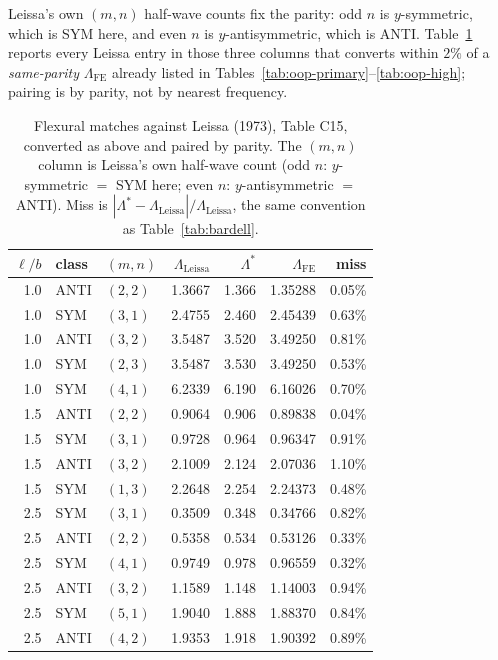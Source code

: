 \documentclass[11pt]{article}
\begin{document}
Leissa's own $(m,n)$ half-wave counts fix the parity: odd $n$ is
$y$-symmetric, which is SYM here, and even $n$ is $y$-antisymmetric, which
is ANTI. Table~\ref{tab:leissa} reports every Leissa entry in those three
columns that converts within $2\%$ of a \emph{same-parity}
$\Lambda_{\mathrm{FE}}$ already listed in
Tables~\ref{tab:oop-primary}--\ref{tab:oop-high}; pairing is by parity,
not by nearest frequency.

\begin{table}[!htbp]
\centering\footnotesize
\caption{Flexural matches against Leissa (1973), Table C15, converted as
above and paired by parity. The $(m,n)$ column is Leissa's own half-wave
count (odd $n$: $y$-symmetric $=$ SYM here; even $n$: $y$-antisymmetric $=$
ANTI). Miss is
$|\Lambda^{*}-\Lambda_{\text{Leissa}}|/\Lambda_{\text{Leissa}}$, the same
convention as Table~\ref{tab:bardell}.}\label{tab:leissa}
\setlength{\tabcolsep}{4pt}
\begin{tabular}{@{}rllrrrr@{}}
\toprule
$\ell/b$ & class & $(m,n)$ & $\Lambda_{\text{Leissa}}$ & $\Lambda^{*}$ & $\Lambda_{\mathrm{FE}}$ & miss \\
\midrule
1.0 & ANTI & $(2,2)$ & 1.3667 & 1.366 & 1.35288 & 0.05\% \\
1.0 & SYM  & $(3,1)$ & 2.4755 & 2.460 & 2.45439 & 0.63\% \\
1.0 & ANTI & $(3,2)$ & 3.5487 & 3.520 & 3.49250 & 0.81\% \\
1.0 & SYM  & $(2,3)$ & 3.5487 & 3.530 & 3.49250 & 0.53\% \\
1.0 & SYM  & $(4,1)$ & 6.2339 & 6.190 & 6.16026 & 0.70\% \\
1.5 & ANTI & $(2,2)$ & 0.9064 & 0.906 & 0.89838 & 0.04\% \\
1.5 & SYM  & $(3,1)$ & 0.9728 & 0.964 & 0.96347 & 0.91\% \\
1.5 & ANTI & $(3,2)$ & 2.1009 & 2.124 & 2.07036 & 1.10\% \\
1.5 & SYM  & $(1,3)$ & 2.2648 & 2.254 & 2.24373 & 0.48\% \\
2.5 & SYM  & $(3,1)$ & 0.3509 & 0.348 & 0.34766 & 0.82\% \\
2.5 & ANTI & $(2,2)$ & 0.5358 & 0.534 & 0.53126 & 0.33\% \\
2.5 & SYM  & $(4,1)$ & 0.9749 & 0.978 & 0.96559 & 0.32\% \\
2.5 & ANTI & $(3,2)$ & 1.1589 & 1.148 & 1.14003 & 0.94\% \\
2.5 & SYM  & $(5,1)$ & 1.9040 & 1.888 & 1.88370 & 0.84\% \\
2.5 & ANTI & $(4,2)$ & 1.9353 & 1.918 & 1.90392 & 0.89\% \\
\bottomrule
\end{tabular}
\end{table}
\end{document}
